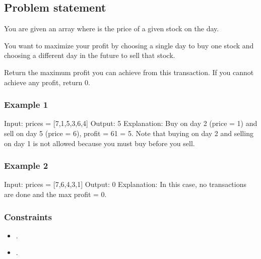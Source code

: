 \documentclass[letterpaper,12pt,english]{book}
\begin{document}
\subsection{Problem statement\sphinxfootnotemark[111]}
\label{\detokenize{Mathematics/09_MTH_121_Best_Time_to_Buy_and_Sell_Stock:problem-statement}}%
\begin{footnotetext}[111]\sphinxAtStartFootnote
{}
%
\end{footnotetext}\ignorespaces 
\sphinxAtStartPar
You are given an array  where  is the price of a given stock on the  day.

\sphinxAtStartPar
You want to maximize your profit by choosing a single day to buy one stock and choosing a different day in the future to sell that stock.

\sphinxAtStartPar
Return the maximum profit you can achieve from this transaction. If you cannot achieve any profit, return 0.


\subsubsection{Example 1}
\label{\detokenize{Mathematics/09_MTH_121_Best_Time_to_Buy_and_Sell_Stock:example-1}}
\begin{sphinxVerbatim}[commandchars=\\\{\}]
Input: prices = [7,1,5,3,6,4]
Output: 5
Explanation: Buy on day 2 (price = 1) and sell on day 5 (price = 6), profit = 6\PYGZhy{}1 = 5.
Note that buying on day 2 and selling on day 1 is not allowed because you must buy before you sell.
\end{sphinxVerbatim}


\subsubsection{Example 2}
\label{\detokenize{Mathematics/09_MTH_121_Best_Time_to_Buy_and_Sell_Stock:example-2}}
\begin{sphinxVerbatim}[commandchars=\\\{\}]
Input: prices = [7,6,4,3,1]
Output: 0
Explanation: In this case, no transactions are done and the max profit = 0.
\end{sphinxVerbatim}


\subsubsection{Constraints}
\label{\detokenize{Mathematics/09_MTH_121_Best_Time_to_Buy_and_Sell_Stock:constraints}}\begin{itemize}
\item {} 
\sphinxAtStartPar
{}.

\item {} 
\sphinxAtStartPar
{}.

\end{itemize}
\end{document}
